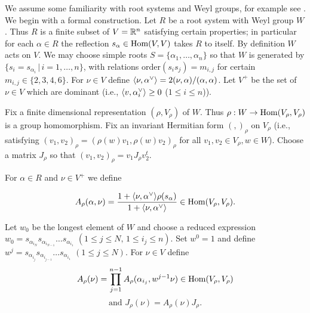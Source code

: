 %
%
%

We assume some familiarity with root systems and Weyl groups, for example see 
\cite{humphreys_coxeter}.
We begin with a formal construction.  Let $R$ be a root system with
Weyl group $W$. Thus $R$ is a finite subset of $V={\mathbb R}^n$ satisfying
certain properties; in particular for each $\alpha\in R$
the reflection $s_\alpha\in \text{Hom}(V,V)$ takes $R$ to itself.  By
definition $W$ acts on $V$. We may choose simple roots
$S=\{\alpha_1,\dots, \alpha_n\}$ so that $W$ is generated by
$\{s_i=s_{\alpha_i}\,|\,i=1,\dots,n\}$, with relations
$\text{order}(s_is_j)=m_{i,j}$ for certain $m_{i,j}\in\{2,3,4,6\}$.
For $\nu\in V$ define $\langle\nu,\alpha^\vee\rangle=2(\nu,\alpha)/(\alpha,\alpha)$. 
Let $V^+$ be the set of $\nu\in V$ which are dominant (i.e.,
$\langle v,\alpha^\vee_i\rangle\ge0$ ($1\le i\le n$)).

Fix a finite dimensional representation $(\rho,V_\rho)$ of $W$.
Thus $\rho:W\rightarrow \text{Hom}(V_\rho,V_\rho)$ is a group
homomorphism. Fix an invariant Hermitian form $(,)_\rho$ on
$V_\rho$ (i.e., satisfying
$(v_1,v_2)_\rho=(\rho(w)v_1,\rho(w)v_2)_\rho$ 
for all $v_1,v_2\in
V_\rho, w\in W$). 
Choose a matrix $J_\rho$ so that $(v_1,v_2)_\rho=v_1J_\rho v_2^t$.


For $\alpha\in R$ and  $\nu\in V^+$ we define 

\begin{equation}
\label{A}
A_\rho(\alpha,\nu)=\frac{1+\langle\nu,\alpha^\vee\rangle\rho(s_{\alpha})}{1+\langle\nu,\alpha^\vee\rangle}
\in\text{Hom}(V_\rho,V_\rho).
\end{equation}

Let $w_0$ be the longest element of $W$ and choose a reduced expression
$w_0=s_{\alpha_{i_N}}s_{\alpha_{i_{N-1}}}\dots s_{\alpha_{i_1}}$
$(1\le j\le N,\,1\le i_j\le n)$.
Set $w^0=1$  and define
$w^j=s_{\alpha_{i_j}}s_{\alpha_{i_{j-1}}}\dots s_{\alpha_{i_1}}$
$(1\le j\le N)$.
For $\nu\in V$ define
\begin{equation}
A_\rho(\nu)=\prod_{j=1}^{n-1}A_\rho(\alpha_{i_j},w^{j-1}\nu)\in\text{Hom}(V_\rho,V_\rho)
\end{equation}
\begin{equation}
\mbox{and }
J_\rho(\nu)=A_\rho(\nu)J_\rho.
\end{equation}

